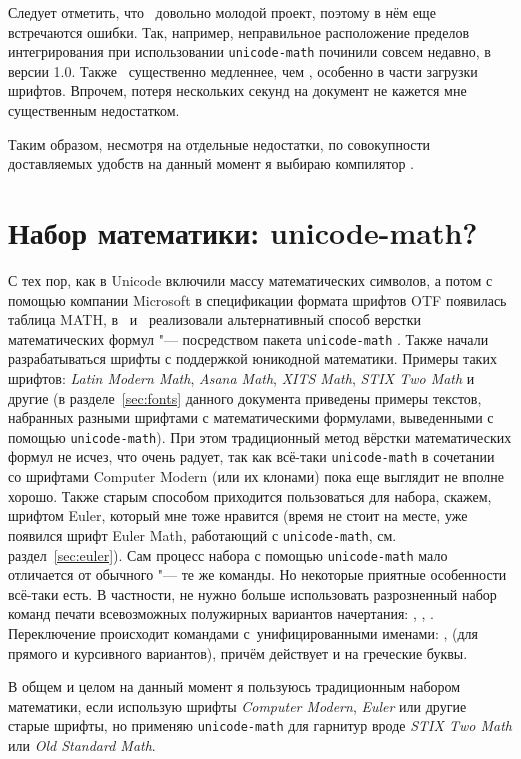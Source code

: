 \documentclass[a4paper,12pt,hyphens]{article}
\newcommand\package[1]{\texttt{#1}}
\newcommand\lcmd[1]{\texttt{#1}}
\begin{document}
Следует отметить, что \LuaTeX\ довольно молодой проект, поэтому в нём еще
встречаются ошибки. Так, например, неправильное расположение пределов
интегрирования при использовании \package{unicode-math} починили совсем недавно,
в версии 1.0. Также \LuaTeX\ существенно медленнее, чем \pdfTeX, особенно в части
загрузки шрифтов. Впрочем, потеря нескольких секунд на документ не кажется мне
существенным недостатком.

Таким образом, несмотря на отдельные недостатки, по совокупности доставляемых
удобств на данный момент я выбираю компилятор \LuaTeX.

\section{Набор математики: unicode-math?}
С тех пор, как в Unicode включили массу математических символов, а потом с
помощью компании Microsoft в спецификации формата шрифтов OTF
появилась таблица MATH, в \LuaLaTeX\ и \XeTeX\ реализовали альтернативный
способ верстки математических формул "--- посредством пакета
\package{unicode-math} \parencite{ctan-unicode-math}.
Также начали разрабатываться шрифты с поддержкой юникодной математики. Примеры таких
шрифтов: \emph{Latin Modern Math}, \emph{Asana Math}, \emph{XITS Math},
\emph{STIX Two Math} и другие (в разделе~\ref{sec:fonts} данного документа приведены
примеры текстов, набранных разными шрифтами с математическими формулами, выведенными
с помощью \package{unicode-math}).
При этом традиционный метод вёрстки математических формул не исчез, что
очень радует, так как всё-таки \package{unicode-math} в сочетании со шрифтами
Computer Modern (или их клонами) пока еще выглядит не вполне хорошо.
Также старым способом приходится пользоваться для набора, скажем, шрифтом
Euler, который мне тоже нравится (время не стоит на месте, уже появился шрифт Euler Math,
работающий с \package{unicode-math}, см. раздел~\ref{sec:euler}). Сам процесс набора с помощью \package{unicode-math}
мало отличается от обычного "--- те же команды. Но некоторые приятные особенности всё-таки
есть. В частности, не нужно больше использовать разрозненный набор команд
печати всевозможных полужирных вариантов начертания: \lcmd{\mathbf}, \lcmd{\boldkey},
\lcmd{\boldsymbol}. Переключение происходит командами с~унифицированными именами:
\lcmd{\symbfup}, \lcmd{\symbfit} (для прямого и курсивного вариантов), причём
действует и на греческие буквы.

В общем и целом на данный момент я пользуюсь традиционным набором математики,
если использую шрифты \emph{Computer Modern}, \emph{Euler} или другие старые шрифты, но
применяю \package{unicode-math} для гарнитур вроде \emph{STIX Two Math} или
\emph{Old Standard Math}.
\end{document}
